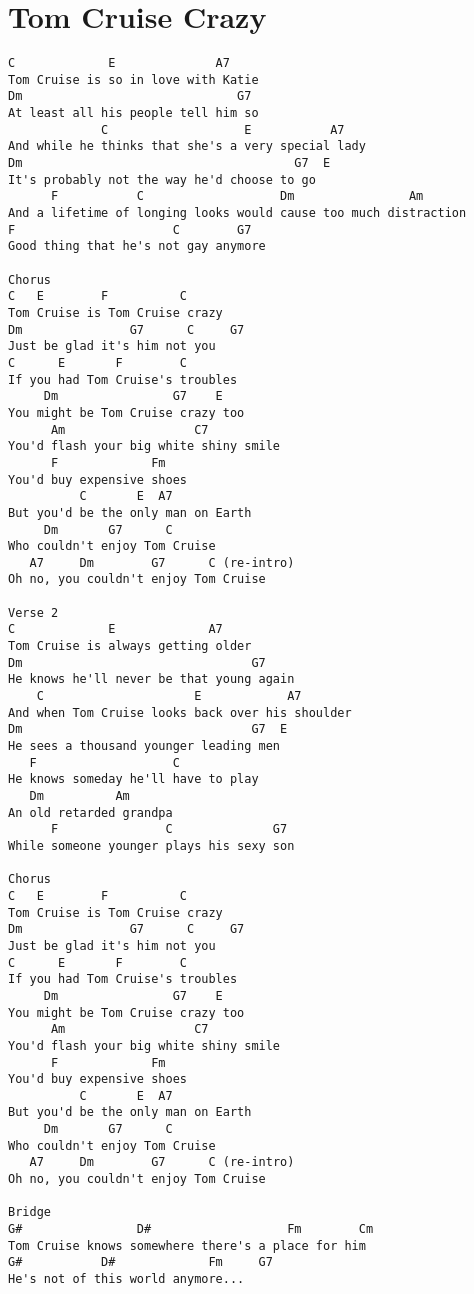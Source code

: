 \documentclass[leqno]{memoir}
\begin{document}
\chapter{Tom Cruise Crazy}
\begin{verbatim}
C             E              A7
Tom Cruise is so in love with Katie
Dm                              G7
At least all his people tell him so
             C                   E           A7
And while he thinks that she's a very special lady
Dm                                      G7  E
It's probably not the way he'd choose to go
      F           C                   Dm                Am
And a lifetime of longing looks would cause too much distraction
F                      C        G7
Good thing that he's not gay anymore

Chorus
C   E        F          C
Tom Cruise is Tom Cruise crazy
Dm               G7      C     G7
Just be glad it's him not you
C      E       F        C
If you had Tom Cruise's troubles
     Dm                G7    E
You might be Tom Cruise crazy too
      Am                  C7
You'd flash your big white shiny smile
      F             Fm
You'd buy expensive shoes
          C       E  A7
But you'd be the only man on Earth
     Dm       G7      C
Who couldn't enjoy Tom Cruise
   A7     Dm        G7      C (re-intro)
Oh no, you couldn't enjoy Tom Cruise

Verse 2
C             E             A7
Tom Cruise is always getting older
Dm                                G7
He knows he'll never be that young again
    C                     E            A7
And when Tom Cruise looks back over his shoulder
Dm                                G7  E
He sees a thousand younger leading men
   F                   C
He knows someday he'll have to play
   Dm          Am
An old retarded grandpa
      F               C              G7
While someone younger plays his sexy son

Chorus
C   E        F          C
Tom Cruise is Tom Cruise crazy
Dm               G7      C     G7
Just be glad it's him not you
C      E       F        C
If you had Tom Cruise's troubles
     Dm                G7    E
You might be Tom Cruise crazy too
      Am                  C7
You'd flash your big white shiny smile
      F             Fm
You'd buy expensive shoes
          C       E  A7
But you'd be the only man on Earth
     Dm       G7      C
Who couldn't enjoy Tom Cruise
   A7     Dm        G7      C (re-intro)
Oh no, you couldn't enjoy Tom Cruise

Bridge
G#                D#                   Fm        Cm
Tom Cruise knows somewhere there's a place for him
G#           D#             Fm     G7
He's not of this world anymore...


\end{verbatim}
\end{document}
